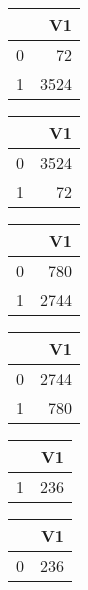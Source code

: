 \bigskip\bigskip
\centering
\begin{tabular}{rr}
  \hline
 & V1 \\ 
  \hline
0 &  72 \\ 
  1 & 3524 \\ 
   \hline
\end{tabular}

\bigskip\bigskip
\centering
\begin{tabular}{rr}
  \hline
 & V1 \\ 
  \hline
0 & 3524 \\ 
  1 &  72 \\ 
   \hline
\end{tabular}

\bigskip\bigskip
\centering
\begin{tabular}{rr}
  \hline
 & V1 \\ 
  \hline
0 & 780 \\ 
  1 & 2744 \\ 
   \hline
\end{tabular}

\bigskip\bigskip
\centering
\begin{tabular}{rr}
  \hline
 & V1 \\ 
  \hline
0 & 2744 \\ 
  1 & 780 \\ 
   \hline
\end{tabular}

\bigskip\bigskip
\centering
\begin{tabular}{rr}
  \hline
 & V1 \\ 
  \hline
1 & 236 \\ 
   \hline
\end{tabular}

\bigskip\bigskip
\centering
\begin{tabular}{rr}
  \hline
 & V1 \\ 
  \hline
0 & 236 \\ 
   \hline
\end{tabular}

